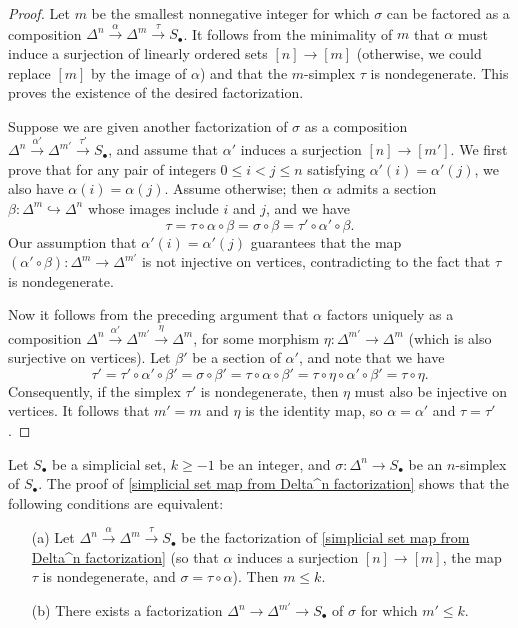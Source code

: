 \begin{proof}
Let $m$ be the smallest nonnegative integer for which $\sigma$ can be factored as a composition $\Delta^n\stackrel{\alpha}{\to}\Delta^m\stackrel{\tau}{\to}S_\bullet$. It follows from the minimality of $m$ that $\alpha$ must induce a surjection of linearly ordered sets $[n]\to[m]$ (otherwise, we could replace $[m]$ by the image of $\alpha$) and that the $m$-simplex $\tau$ is nondegenerate. This proves the existence of the desired factorization.\par
Suppose we are given another factorization of $\sigma$ as a
composition $\Delta^n\stackrel{\alpha'}{\to}\Delta^{m'}\stackrel{\tau'}{\to}S_\bullet$, and assume that $\alpha'$ induces a surjection $[n]\to[m']$. We first prove that for any pair of integers $0\leq i<j\leq n$ satisfying $\alpha'(i)=\alpha'(j)$, we also have $\alpha(i)=\alpha(j)$. Assume otherwise; then $\alpha$ admits a section $\beta:\Delta^m\hookrightarrow\Delta^n$ whose images include $i$ and $j$, and we have
\[\tau=\tau\circ\alpha\circ\beta=\sigma\circ\beta=\tau'\circ\alpha'\circ\beta.\]
Our assumption that $\alpha'(i)=\alpha'(j)$ guarantees that the map $(\alpha'\circ\beta):\Delta^m\to\Delta^{m'}$ is not injective on vertices, contradicting to the fact that $\tau$ is nondegenerate.\par
Now it follows from the preceding argument that $\alpha$ factors uniquely as a composition $\Delta^n\stackrel{\alpha'}{\to}\Delta^{m'}\stackrel{\eta}{\to}\Delta^m$, for some morphism $\eta:\Delta^{m'}\to\Delta^m$ (which is also surjective on vertices). Let $\beta'$ be a section of $\alpha'$, and note that we have
\[\tau'=\tau'\circ\alpha'\circ\beta'=\sigma\circ\beta'=\tau\circ\alpha\circ\beta'=\tau\circ\eta\circ\alpha'\circ\beta'=\tau\circ\eta.\]
Consequently, if the simplex $\tau'$ is nondegenerate, then $\eta$ must also be injective on vertices. It follows that $m'=m$ and $\eta$ is the identity map, so $\alpha=\alpha'$ and $\tau=\tau'$.
\end{proof}
Let $S_\bullet$ be a simplicial set, $k\geq-1$ be an integer, and $\sigma:\Delta^n\to S_\bullet$ be an $n$-simplex of $S_\bullet$. The proof of \cref{simplicial set map from Delta^n factorization} shows that the following conditions are equivalent:
\begin{itemize}
\item[(a)] Let $\Delta^n\stackrel{\alpha}{\to}\Delta^m\stackrel{\tau}{\to}S_\bullet$ be the factorization of \cref{simplicial set map from Delta^n factorization} (so that $\alpha$ induces a surjection $[n]\to[m]$, the map $\tau$ is nondegenerate, and $\sigma=\tau\circ\alpha$). Then $m\leq k$.
\item[(b)] There exists a factorization $\Delta^n\to\Delta^{m'}\to S_\bullet$ of $\sigma$ for which $m'\leq k$.
\end{itemize}
